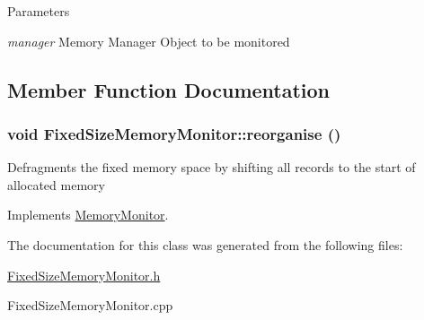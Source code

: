 \begin{DoxyParams}{Parameters}
\item[{\em manager}]Memory Manager Object to be monitored \end{DoxyParams}


\subsection{Member Function Documentation}
\hypertarget{classFixedSizeMemoryMonitor_aa88727ff9d284f96d626bb006880dd21}{
\subsubsection[{reorganise}]{\setlength{\rightskip}{0pt plus 5cm}void FixedSizeMemoryMonitor::reorganise ()}}
\label{classFixedSizeMemoryMonitor_aa88727ff9d284f96d626bb006880dd21}
Defragments the fixed memory space by shifting all records to the start of allocated memory 

Implements \hyperlink{classMemoryMonitor}{MemoryMonitor}.



The documentation for this class was generated from the following files:\begin{DoxyCompactItemize}
\item 
\hyperlink{FixedSizeMemoryMonitor_8h}{FixedSizeMemoryMonitor.h}\item 
FixedSizeMemoryMonitor.cpp\end{DoxyCompactItemize}
